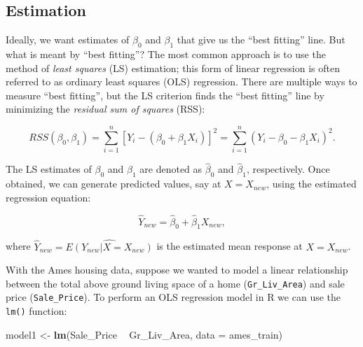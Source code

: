 \documentclass[]{krantz}
\makeatletter
\newenvironment{Shaded}{\begin{snugshade}}{\end{snugshade}}
\newcommand{\DataTypeTok}[1]{\textcolor[rgb]{0.27,0.27,0.27}{#1}}
\newcommand{\KeywordTok}[1]{\textcolor[rgb]{0.27,0.27,0.27}{\textbf{#1}}}
\newcommand{\NormalTok}[1]{#1}
\newcommand{\OperatorTok}[1]{\textcolor[rgb]{0.43,0.43,0.43}{\textbf{#1}}}
\newcommand{\StringTok}[1]{\textcolor[rgb]{0.5,0.5,0.5}{#1}}
\newenvironment{kframe}{%
\medskip{}
\setlength{\fboxsep}{.8em}
 \def\at@end@of@kframe{}%
 \ifinner\ifhmode%
  \def\at@end@of@kframe{\end{minipage}}%
  \begin{minipage}{\columnwidth}%
 \fi\fi%
 \def\FrameCommand##1{\hskip\@totalleftmargin \hskip-\fboxsep
 \colorbox{shadecolor}{##1}\hskip-\fboxsep
     \hskip-\linewidth \hskip-\@totalleftmargin \hskip\columnwidth}%
 \MakeFramed {\advance\hsize-\width
   \@totalleftmargin\z@ \linewidth\hsize
   \@setminipage}}%
 {\par\unskip\endMakeFramed%
 \at@end@of@kframe}
\renewenvironment{Shaded}{\begin{kframe}}{\end{kframe}}
\makeatother
\begin{document}
\hypertarget{estimation}{%
\subsection{Estimation}\label{estimation}}

Ideally, we want estimates of \(\beta_0\) and \(\beta_1\) that give us the ``best fitting'' line. But what is meant by ``best fitting''? The most common approach is to use the method of \emph{least squares} (LS) estimation; this form of linear regression is often referred to as ordinary least squares (OLS) regression. There are multiple ways to measure ``best fitting'', but the LS criterion finds the ``best fitting'' line by minimizing the \emph{residual sum of squares} (RSS):

\begin{equation}
\label{eq:least-squares-simple}
  RSS\left(\beta_0, \beta_1\right) = \sum_{i=1}^n\left[Y_i - \left(\beta_0 + \beta_1 X_i\right)\right]^2 = \sum_{i=1}^n\left(Y_i - \beta_0 - \beta_1 X_i\right)^2.
\end{equation}

The LS estimates of \(\beta_0\) and \(\beta_1\) are denoted as \(\widehat{\beta}_0\) and \(\widehat{\beta}_1\), respectively. Once obtained, we can generate predicted values, say at \(X = X_{new}\), using the estimated regression equation:

\begin{equation}
  \widehat{Y}_{new} = \widehat{\beta}_0 + \widehat{\beta}_1 X_{new},
\end{equation}

where \(\widehat{Y}_{new} = \widehat{E\left(Y_{new} | X = X_{new}\right)}\) is the estimated mean response at \(X = X_{new}\).

With the Ames housing data, suppose we wanted to model a linear relationship between the total above ground living space of a home (\texttt{Gr\_Liv\_Area}) and sale price (\texttt{Sale\_Price}). To perform an OLS regression model in R we can use the \texttt{lm()} function:

\begin{Shaded}
\begin{Highlighting}[]
\NormalTok{model1 <-}\StringTok{ }\KeywordTok{lm}\NormalTok{(Sale_Price }\OperatorTok{~}\StringTok{ }\NormalTok{Gr_Liv_Area, }\DataTypeTok{data =}\NormalTok{ ames_train)}
\end{Highlighting}
\end{Shaded}
\end{document}

